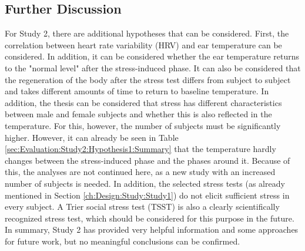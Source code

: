 \subsection{Further Discussion}
For Study 2, there are additional hypotheses that can be considered. 
First, the correlation between heart rate variability (HRV) and ear temperature can be considered. 
In addition, it can be considered whether the ear temperature returns to the "normal level" after the stress-induced phase.
It can also be considered that the regeneration of the body after the stress test differs from subject to subject and takes different amounts of time to return to baseline temperature.
In addition, the thesis can be considered that stress has different characteristics between male and female subjects and whether this is also reflected in the temperature.
For this, however, the number of subjects must be significantly higher.
However, it can already be seen in Table \ref{sec:Evaluation:Study2:Hypothesis1:Summary} that the temperature hardly changes between the stress-induced phase and the phases around it. 
Because of this, the analyses are not continued here, as a new study with an increased number of subjects is needed.
In addition, the selected stress tests (as already mentioned in Section \ref{ch:Design:Study:Study1}) do not elicit sufficient stress in every subject.
A Trier social stress test (TSST) is also a clearly scientifically recognized stress test, which should be considered for this purpose in the future.
In summary, Study 2 has provided very helpful information and some approaches for future work, but no meaningful conclusions can be confirmed.